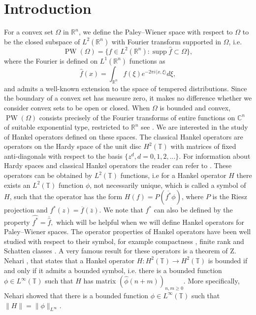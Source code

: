 \documentclass[footinclude=true]{amsart}
\theoremstyle{plain}
\DeclareMathOperator{\PW}{PW}
\DeclareMathOperator{\supp}{supp}
\begin{document}
	\section{Introduction} 
	For a convex set $\Omega$ in $\mathbb{R}^{n}$, we define the Paley--Wiener space with respect to $\Omega$ to be the closed subspace of $L^{2}(\mathbb{R}^{n})$ with Fourier transform supported in $\Omega$, i.e. 
	$$\PW(\Omega)=\{f\in L^{2}(\mathbb{R}^{n}):\supp\widehat{f}\subset \Omega\},$$ where the Fourier is defined on $L^1(\mathbb{R}^{n})$ functions as $$\widehat{f}(x)=\int_{\mathbb{R}^n}f(\xi)e^{-2\pi i\langle x,\xi\rangle}d\xi,$$ and admits a well-known extension to the space of tempered distributions. Since the boundary of a convex set has measure zero, it makes no difference whether we consider convex sets to be open or closed. When $\Omega$ is bounded and convex, $\PW(\Omega)$ consists precisely of the Fourier transforms of entire functions on $\mathbb{C}^n$ of suitable exponential type, restricted to $\mathbb{R}^n$ see \cite{MR1451142}. We are interested in the study of Hankel operators defined on these spaces. The classical Hankel operators are operators on the Hardy space of the unit disc $H^{2}(\mathbb{T})$ with matrices of fixed anti-diagonals with respect to the basis $\{z^{d},d=0,1,2,...\}$. For information about Hardy spaces and classical Hankel operators the reader can refer to \cite{MR1892647}. These operators can be obtained by $L^{2}(\mathbb{T})$ functions, i.e for a Hankel operator $H$ there exists an $L^{2}(\mathbb{T})$ function $\phi$, not necessarily unique, which is called a symbol of $H$, such that the operator has the form $H(f)=P(\overline{f^\ast} \phi)$, where $P$ is the Riesz projection and $f^\ast(z)=\overline{f}(\overline{z})$. We note that $f^{\ast}$ can also be defined by the property $\widehat{f^\ast}=\overline{\widehat{f}},$ which will be helpful when we will define Hankel operators for Paley--Wiener spaces. The operator properties of Hankel operators have been well studied with respect to their symbol, for example compactness \cite{MR108684}, finite rank \cite{MR0237286} and Schatten classes \cite{MR1949210, MR674875}. A very famous result for these operators is a theorem of Z. Nehari \cite{MR82945}, that states that a Hankel operator $H:H^2(\mathbb{T})\to H^2(\mathbb{T})$ is bounded if and only if it admits a bounded symbol, i.e. there is a bounded function $\phi\in L^{\infty}(\mathbb{T})$ such that $H$ has matrix $(\widehat{\phi}(n+m))_{n,m\geq 0}$. More specifically, Nehari showed that there is a bounded function $\phi\in L^{\infty}(\mathbb{T})$ such that $\|H\|=\|\phi\|_{L^\infty}$.
\end{document}
